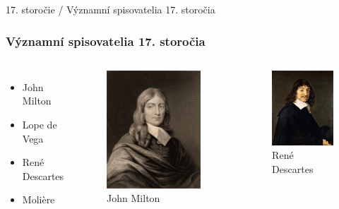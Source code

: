 \documentclass[dvipsnames]{beamer}
\begin{document}
\begin{frame}{\small \textcolor{g}{17. storočie} / \Large Významní spisovatelia 17. storočia}
	\subsubsection{Významní spisovatelia 17. storočia}
	\begin{columns}

		\begin{itemize}
			\item John Milton
			      \bigskip
			\item Lope de Vega
			      \bigskip
			\item René Descartes
			      \bigskip
			\item Molière
		\end{itemize}
		\begin{figure}
			\includegraphics[scale=0.25]{milton}
			\caption{John Milton}
		\end{figure}%
		\begin{figure}
			\includegraphics[scale=0.35]{dekart}
			\caption{René Descartes}
		\end{figure}

	\end{columns}
\end{frame}
\end{document}
